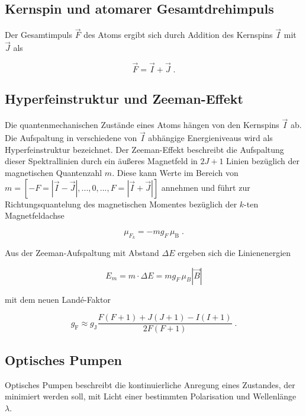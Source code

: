 \subsection{Kernspin und atomarer Gesamtdrehimpuls}

Der Gesamtimpuls $\vec{F}$ des Atoms ergibt sich durch Addition des Kernspins $\vec{I}$ mit $\vec{J}$ als 

\begin{equation}
    \vec{F} = \vec{I} + \vec{J} \; .
\end{equation}

\subsection{Hyperfeinstruktur und Zeeman-Effekt}

Die quantenmechanischen Zustände eines Atoms hängen von den Kernspins $\vec{I}$ ab. Die Aufspaltung in verschiedene 
von $\vec{I}$ abhängige Energieniveaus wird als Hyperfeinstruktur bezeichnet. Der Zeeman-Effekt beschreibt die Aufspaltung dieser
Spektrallinien durch ein äußeres Magnetfeld in $2J+1$ Linien bezüglich der magnetischen Quantenzahl $m$. Diese kann Werte im Bereich
von $m = \left[-F = |\vec{I}-\vec{J}|, ... , 0, ..., F = |\vec{I} + \vec{J}| \right]$ annehmen und führt zur 
Richtungsquantelung des magnetischen Momentes bezüglich der $k$-ten Magnetfeldachse

\begin{equation}
    \mu_{F_k} = -m g_F\, \mu_\text{B} \; .
\end{equation}

Aus der Zeeman-Aufspaltung mit Abstand $\Delta E$ ergeben sich die Linienenergien  

\begin{equation}
    E_m = m \cdot \Delta E = m g_F \, \mu_B |\vec{B}|
\end{equation}

mit dem neuen Land\'{e}-Faktor

\begin{equation}
    \label{eqn:lande}
    g_\text{F}\approx g_\text{J}\frac{F\left(F+1\right)+J\left(J+1\right)-I\left(I+1\right)}{2F\left(F+1\right)} \; .
\end{equation}

\subsection{Optisches Pumpen}

Optisches Pumpen beschreibt die kontinuierliche Anregung eines Zustandes, der minimiert werden soll, mit Licht einer
bestimmten Polarisation und Wellenlänge $\lambda$.

